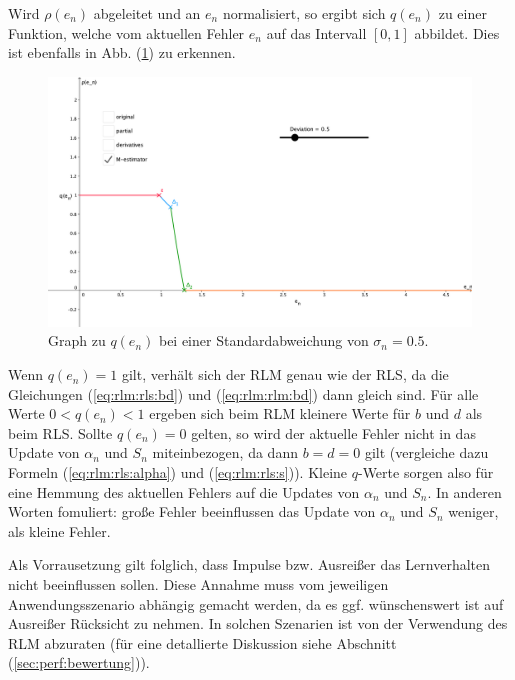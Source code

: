 \documentclass[a4paper, 12pt]{article}
\begin{document}
{Wird $\rho(e_n)$ abgeleitet und an $e_n$ normalisiert, so ergibt sich $q(e_n)$ zu einer Funktion, welche vom aktuellen Fehler $e_n$ auf das Intervall $[0,1]$ abbildet. Dies ist ebenfalls in Abb. (\ref{fig:m-estimate-q}) zu erkennen.
\begin{figure}[H]
    \centering
    \includegraphics[width=\textwidth]{./images/m_estimate_q.pdf}
    \caption{Graph zu $q(e_n)$ bei einer Standardabweichung von $\sigma_n = 0.5$.}
    \label{fig:m-estimate-q}
\end{figure}
Wenn $q(e_n) = 1$ gilt, verhält sich der RLM genau wie der RLS, da die Gleichungen (\ref{eq:rlm:rls:bd}) und (\ref{eq:rlm:rlm:bd}) dann gleich sind. Für alle Werte $0 < q(e_n) < 1$ ergeben sich beim RLM kleinere Werte für $b$ und $d$ als beim RLS. Sollte $q(e_n) = 0$ gelten, so wird der aktuelle Fehler nicht in das Update von $\alpha_n$ und $S_n$ miteinbezogen, da dann $b=d=0$ gilt (vergleiche dazu Formeln (\ref{eq:rlm:rls:alpha}) und (\ref{eq:rlm:rls:s})). 
Kleine $q$-Werte sorgen also für eine Hemmung des aktuellen Fehlers auf die Updates von $\alpha_n$ und $S_n$.
In anderen Worten fomuliert: große Fehler beeinflussen das Update von $\alpha_n$ und $S_n$ weniger, als kleine Fehler.

Als Vorrausetzung gilt folglich, dass Impulse bzw. Ausreißer das Lernverhalten nicht beeinflussen sollen. Diese Annahme muss vom jeweiligen Anwendungsszenario abhängig gemacht werden, da es ggf. wünschenswert ist auf Ausreißer Rücksicht zu nehmen. In solchen Szenarien ist von der Verwendung des RLM abzuraten (für eine detallierte Diskussion siehe Abschnitt (\ref{sec:perf:bewertung})).

}
\end{document}
